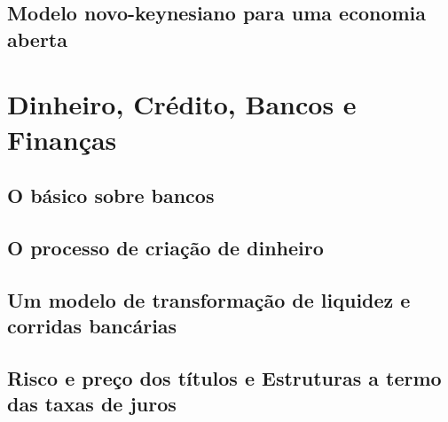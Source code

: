 \documentclass[a4paper,11pt]{book}
\theoremstyle{definition}
\begin{document}
\chapter{Modelo novo-keynesiano para uma economia aberta}

\part{Dinheiro, Crédito, Bancos e Finanças}

\chapter{O básico sobre bancos}

\chapter{O processo de criação de dinheiro}

\chapter{Um modelo de transformação de liquidez e corridas bancárias}

\chapter{Risco e preço dos títulos e Estruturas a termo das taxas de juros}

\end{document}

